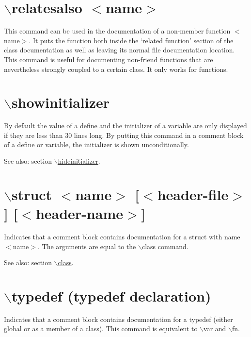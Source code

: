  \hypertarget{commands_cmdrelatesalso}{}\section{$\backslash$relatesalso $<$name$>$}\label{commands_cmdrelatesalso}
 This command can be used in the documentation of a non-member function $<$name$>$. It puts the function both inside the `related function' section of the class documentation as well as leaving its normal file documentation location. This command is useful for documenting non-friend functions that are nevertheless strongly coupled to a certain class. It only works for functions.



 \hypertarget{commands_cmdshowinitializer}{}\section{$\backslash$showinitializer}\label{commands_cmdshowinitializer}
 By default the value of a define and the initializer of a variable are only displayed if they are less than 30 lines long. By putting this command in a comment block of a define or variable, the initializer is shown unconditionally.

\begin{Desc}
\item[See also:]section \hyperlink{commands_cmdhideinitializer}{$\backslash$hideinitializer}.\end{Desc}


 \hypertarget{commands_cmdstruct}{}\section{$\backslash$struct $<$name$>$ \mbox{[}$<$header-file$>$\mbox{]} \mbox{[}$<$header-name$>$\mbox{]}}\label{commands_cmdstruct}
 Indicates that a comment block contains documentation for a struct with name $<$name$>$. The arguments are equal to the $\backslash$class command.

\begin{Desc}
\item[See also:]section \hyperlink{commands_cmdclass}{$\backslash$class}.\end{Desc}


 \hypertarget{commands_cmdtypedef}{}\section{$\backslash$typedef (typedef declaration)}\label{commands_cmdtypedef}
 Indicates that a comment block contains documentation for a typedef (either global or as a member of a class). This command is equivalent to $\backslash$var and $\backslash$fn.

